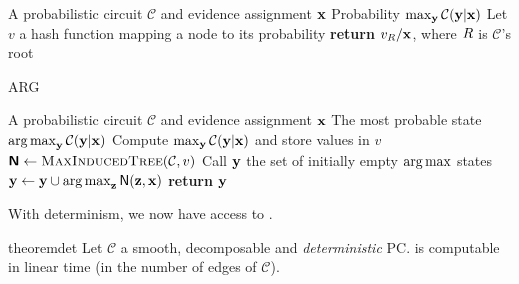 \begin{algorithm}[t]
  \caption{\map}\label{alg:map}
  \begin{algorithmic}[1]
    \Require A probabilistic circuit $\mathcal{C}$ and evidence assignment $\mathbf{x}$
    \Ensure Probability $\max_{\mathbf{y}}\mathcal{C}(\mathbf{y}|\mathbf{x})$
    \State Let $v$ a hash function mapping a node to its probability
    \EndFor%
    \State \textbf{return} $v_{\normalfont{R}}/\mathcal{\mathbf{x}}$, where $\normalfont{R}$ is
    $\mathcal{C}$'s root
  \end{algorithmic}
\end{algorithm}
\begin{algorithm}[t]
  \caption{\textsf{ARG}\map}\label{alg:argmap}
  \begin{algorithmic}[1]
    \Require A probabilistic circuit $\mathcal{C}$ and evidence assignment $\mathbf{x}$
    \Ensure The most probable state $\operatorname*{\normalfont{arg\,max}}_{\mathbf{y}}\mathcal{C}(\mathbf{y}|\mathbf{x})$
    \State Compute $\max_{\mathbf{y}}\mathcal{C}(\mathbf{y}|\mathbf{x})$ and store values in $v$
    \State $\Nodes\gets\textproc{MaxInducedTree}(\mathcal{C}, v)$
    \State Call $\mathbf{y}$ the set of initially empty $\operatorname*{\normalfont{arg\,max}}$ states
      \State $\mathbf{y}\gets\mathbf{y}\cup\operatorname*{\normalfont{arg\,max}}_{\mathbf{z}}\operatorname{\textsf{N}}(\mathbf{z},\mathbf{x})$
    \EndFor%
    \State \textbf{return} $\mathbf{y}$
  \end{algorithmic}
\end{algorithm}

With determinism, we now have access to \map{}.

\begin{restatable}{theorem}{det}
  \label{thm:det}
  Let $\mathcal{C}$ a smooth, decomposable and \emph{deterministic} PC. \map{} is computable in
  linear time (in the number of edges of $\mathcal{C}$).
\end{restatable}


